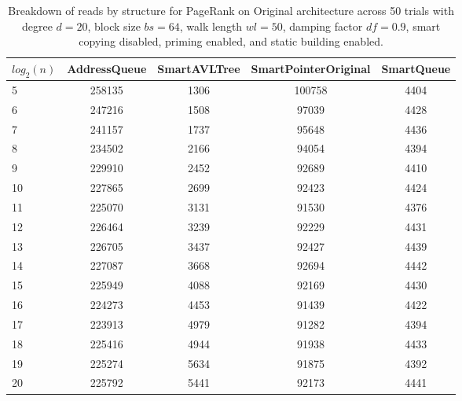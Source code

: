 \begin{table}[]
\centering
\begin{tabular}{|l|c|c|c|c|}
$log_2(n)$ & AddressQueue & SmartAVLTree & SmartPointerOriginal & SmartQueue \\ \hline
5 & 258135 & 1306 & 100758 & 4404 \\ \hline
6 & 247216 & 1508 & 97039 & 4428 \\ \hline
7 & 241157 & 1737 & 95648 & 4436 \\ \hline
8 & 234502 & 2166 & 94054 & 4394 \\ \hline
9 & 229910 & 2452 & 92689 & 4410 \\ \hline
10 & 227865 & 2699 & 92423 & 4424 \\ \hline
11 & 225070 & 3131 & 91530 & 4376 \\ \hline
12 & 226464 & 3239 & 92229 & 4431 \\ \hline
13 & 226705 & 3437 & 92427 & 4439 \\ \hline
14 & 227087 & 3668 & 92694 & 4442 \\ \hline
15 & 225949 & 4088 & 92169 & 4430 \\ \hline
16 & 224273 & 4453 & 91439 & 4422 \\ \hline
17 & 223913 & 4979 & 91282 & 4394 \\ \hline
18 & 225416 & 4944 & 91938 & 4433 \\ \hline
19 & 225274 & 5634 & 91875 & 4392 \\ \hline
20 & 225792 & 5441 & 92173 & 4441 \\ \hline
\end{tabular}
\caption{Breakdown of reads by structure for PageRank on Original architecture across 50 trials with degree $d=20$, block size $bs=64$, walk length $wl=50$, damping factor $df=0.9$, smart copying disabled, priming enabled, and static building enabled.}
    \label{tab:reads_by_structure_pr_d20_bs64_trials50_copiesfalse_primetrue_staticinsertiontrue_wl50_df0.9_ptoriginal_movefalse}
\end{table}

